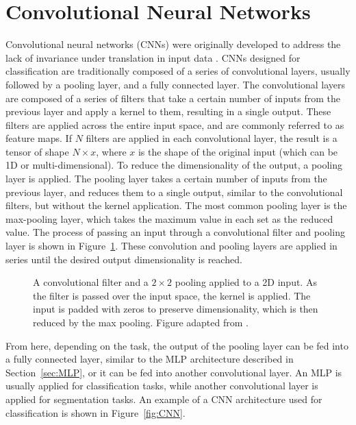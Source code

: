\section{Convolutional Neural Networks}\label{sec:CNN}
Convolutional neural networks (CNNs) were originally developed
to address the lack of invariance under translation in input data \parencite{fukushima1979}.
CNNs designed for classification are traditionally composed of a series of convolutional layers, 
usually followed by a pooling layer, and a fully connected layer. The convolutional 
layers are composed of a series of filters that take a certain 
number of inputs from the previous layer and apply a kernel to them, resulting in 
a single output. These filters are applied across the entire input space, and are 
commonly referred to as feature maps. 
If $N$ filters are applied in 
each convolutional layer, the result is a tensor of shape $N\times x$, where 
$x$ is the shape of the original input (which can be 1D or multi-dimensional). 
To reduce the dimensionality of the output, a pooling layer is applied.
The pooling layer takes a certain number of inputs from the previous layer, and 
reduces them to a single output, similar to the convolutional filters, but 
without the kernel application. The most common pooling layer is the max-pooling
layer, which takes the maximum value in each set as the reduced value. 
The process of passing an input through a convolutional filter and pooling layer is shown in Figure~\ref{fig:convolution}. 
These convolution and pooling layers are applied in series until the desired output dimensionality is reached.
\begin{figure}[t]
    \centering 
    
    \caption[Example of a CNN Unit]{A convolutional filter and a $2\times2$ pooling applied to a 2D input. As the filter is passed 
        over the input space, the kernel is applied. The input is padded with zeros to preserve dimensionality, 
        which is then reduced by the max pooling. Figure adapted from \textcite{neutelings2022_conv}.}
    \label{fig:convolution}
\end{figure}

From here, depending on the task, the output of the pooling layer can be fed
into a fully connected layer, similar to the MLP architecture described
in Section~\ref{sec:MLP}, or it can be fed into another convolutional layer. An
MLP is usually applied for classification tasks, while another convolutional layer
is applied for segmentation tasks. An example of a CNN architecture used for 
classification is shown in Figure~\ref{fig:CNN}.


